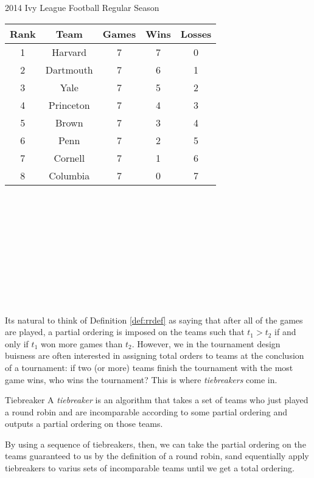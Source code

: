 {\begin{figg}{2014 Ivy League Football Regular Season}{}
    \centering
    \begin{tabular}{| c | c | c | c | c |}
        \hline
        Rank & Team & Games & Wins & Losses\\ \hline
        1 & Harvard & 7 & 7 & 0\\ \hline
        2 & Dartmouth & 7 & 6 & 1\\ \hline
        3 & Yale & 7 & 5 & 2\\ \hline
        4 & Princeton & 7 & 4 & 3\\ \hline
        5 & Brown & 7 & 3 & 4\\ \hline
        6 & Penn & 7 & 2 & 5\\ \hline
        7 & Cornell & 7 & 1 & 6\\ \hline
        8 & Columbia & 7 & 0 & 7\\ \hline
    \end{tabular}
\end{figg}

\;\\\;\\\;\\\;\\\;\\\;\\\;\\\;\\\;\\\;\\

Its natural to think of Definition \ref{def:rrdef} as saying that after all of the games are played, a partial ordering is imposed on the teams such that $t_1 > t_2$ if and only if $t_1$ won more games than $t_2.$ However, we in the tournament design buisness are often interested in assigning total orders to teams at the conclusion of a tournament: if two (or more) teams finish the tournament with the most game wins, who wins the tournament? This is where \textit{tiebreakers} come in.

\begin{definition}{Tiebreaker}{}
    A \textit{tiebreaker} is an algorithm that takes a set of teams who just played a round robin and are incomparable according to some partial ordering and outputs a partial ordering on those teams.
\end{definition}

By using a sequence of tiebreakers, then, we can take the partial ordering on the teams guaranteed to us by the definition of a round robin, sand equentially apply tiebreakers to varius sets of incomparable teams until we get a total ordering.
}